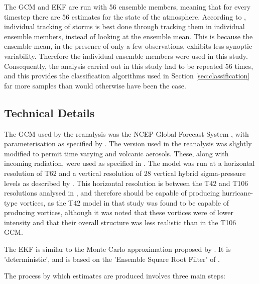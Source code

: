 \documentclass[pdftex,12pt,a4paper]{report}
\begin{document}
The GCM and EKF are run with 56 ensemble members, meaning that for every timestep there are 56
estimates for the state of the atmosphere. According to \textcite{compoTwentieth2011}, individual
tracking of storms is best done through tracking them in individual ensemble members, instead of
looking at the ensemble mean. This is because the ensemble mean, in the presence of only a few
observations, exhibits less synoptic variability. %
Therefore the individual ensemble members were used in this study. Consequently, the analysis
carried out in this study had to be repeated 56 times, and this provides the classification
algorithms used in Section \ref{sec:classification} far more samples than would otherwise have been
the case.

\subsection{Technical Details}

The GCM used by the reanalysis was the NCEP Global Forecast System
\parencite{kanamitsu1989description, kanamitsu1991recent}, with
parameterisation as specified by \textcite{saha2006ncep}. The version used in the reanalysis was
slightly modified to permit time varying  and volcanic aerosols. These, along with incoming
radiation, were used as specified in \textcite{saha2010ncep}. The model was run at a horizontal
resolution of T62 and a vertical resolution of 28 vertical hybrid sigma-pressure levels as described
by \textcite{juang2005discrete}. This horizontal resolution is between the T42 and T106 resolutions
analysed in \textcite{bengtsson1995hurricane}, and therefore should be capable of producing
hurricane-type vortices, as the T42 model in that study was found to be capable of producing
vortices, although it was noted that these vortices were of lower intensity and that their overall
structure was less realistic than in the T106 GCM.

The EKF is similar to the Monte Carlo approximation proposed by \textcite{evensen1994sequential,
evensen2003ensemble}. It is 'deterministic', and is based on the 'Ensemble Square Root Filter' of
\textcite{whitaker2002ensemble}.

The process by which estimates are produced involves three main steps:
\end{document}
